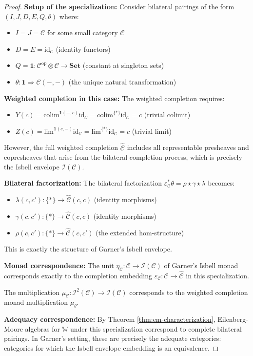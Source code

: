 \documentclass[11pt]{article}
\theoremstyle{plain}
\theoremstyle{definition}
\theoremstyle{remark}
\newcommand{\C}{\mathcal{C}}
\newcommand{\op}{\mathrm{op}}
\newcommand{\id}{\mathrm{id}}
\newcommand{\colim}{\mathrm{colim}}
\renewcommand{\lim}{\mathrm{lim}}
\newcommand{\wh}[1]{\widehat{#1}}
\begin{document}
\begin{proof}
\textbf{Setup of the specialization:}
Consider bilateral pairings of the form $(I, J, D, E, Q, \theta)$ where:
\begin{itemize}
\item $I = J = \C$ for some small category $\C$
\item $D = E = \id_\C$ (identity functors)
\item $Q = \mathbf{1} : \C^{\op} \otimes \C \to \mathbf{Set}$ (constant at singleton sets)
\item $\theta : \mathbf{1} \Rightarrow \C(-, -)$ (the unique natural transformation)
\end{itemize}

\textbf{Weighted completion in this case:}
The weighted completion requires:
\begin{itemize}
\item $Y(c) = \colim^{\mathbf{1}(-, c)} \id_\C = \colim^{\{*\}} \id_\C = c$ (trivial colimit)
\item $Z(c) = \lim^{\mathbf{1}(c, -)} \id_\C = \lim^{\{*\}} \id_\C = c$ (trivial limit)
\end{itemize}

However, the full weighted completion $\wh{\C}$ includes all representable presheaves and copresheaves that arise from the bilateral completion process, which is precisely the Isbell envelope $\mathcal{I}(\C)$.

\textbf{Bilateral factorization:}
The bilateral factorization $\varepsilon_\C^* \theta = \rho \star \gamma \star \lambda$ becomes:
\begin{itemize}
\item $\lambda(c, c') : \{*\} \to \wh{\C}(c, c)$ (identity morphisms)
\item $\gamma(c, c') : \{*\} \to \wh{\C}(c, c)$ (identity morphisms)  
\item $\rho(c, c') : \{*\} \to \wh{\C}(c, c')$ (the extended hom-structure)
\end{itemize}

This is exactly the structure of Garner's Isbell envelope.

\textbf{Monad correspondence:}
The unit $\eta_\C : \C \to \mathcal{I}(\C)$ of Garner's Isbell monad corresponds exactly to the completion embedding $\varepsilon_\C : \C \to \wh{\C}$ in this specialization.

The multiplication $\mu_\C : \mathcal{I}^2(\C) \to \mathcal{I}(\C)$ corresponds to the weighted completion monad multiplication $\mu_\theta$.

\textbf{Adequacy correspondence:}
By Theorem \ref{thm:em-characterization}, Eilenberg-Moore algebras for $\mathbb{W}$ under this specialization correspond to complete bilateral pairings. In Garner's setting, these are precisely the adequate categories: categories for which the Isbell envelope embedding is an equivalence.
\end{proof}
\end{document}
